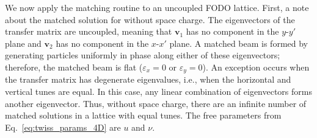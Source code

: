 We now apply the matching routine to an uncoupled FODO lattice. First, a note about the matched solution for without space charge. The eigenvectors of the transfer matrix are uncoupled, meaning that $\mathbf{v}_1$ has no component in the $y$-$y'$ plane and $\mathbf{v}_2$ has no component in the $x$-$x'$ plane. A matched beam is formed by generating particles uniformly in phase along either of these eigenvectors; therefore, the matched beam is flat ($\varepsilon_x = 0$ or $\varepsilon_y = 0$). An exception occurs when the transfer matrix has degenerate eigenvalues, i.e., when the horizontal and vertical tunes are equal. In this case, any linear combination of eigenvectors forms another eigenvector. Thus, without space charge, there are an infinite number of matched solutions in a lattice with equal tunes. The free parameters from Eq.~\eqref{eq:twiss_params_4D} are $u$ and $\nu$.

